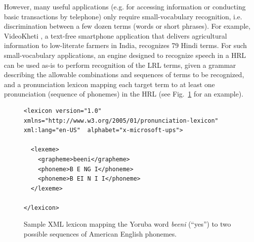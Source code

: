 \documentclass[11pt]{article}
\begin{document}
However, many useful %
applications (e.g. for accessing information or conducting basic transactions by telephone) only require small-vocabulary recognition, i.e. discrimination between
a few dozen terms (words or short phrases).
For example, VideoKheti \cite{bali13}, a text-free smartphone application that delivers agricultural information to low-literate farmers in India, 
recognizes 79 Hindi terms.
For such small-vocabulary applications, 
an engine designed to recognize speech in a HRL
can be used as-is to perform recognition of the LRL terms,
given
a grammar describing the allowable combinations and sequences of terms to be recognized, and a pronunciation lexicon mapping each target term to at least one pronunciation (sequence of phonemes) in the HRL 
(see Fig.~\ref{fig:lexicon} for an example).


\begin{figure}
\begin{lstlisting}	
<lexicon version="1.0" xmlns="http://www.w3.org/2005/01/pronunciation-lexicon" xml:lang="en-US"  alphabet="x-microsoft-ups">
		 
  <lexeme>
    <grapheme>beeni</grapheme>
    <phoneme>B E NG I</phoneme>
    <phoneme>B EI N I I</phoneme>
  </lexeme>
  
</lexicon>
\end{lstlisting}
\caption{Sample XML lexicon mapping the Yoruba word \textit{beeni} (``yes'') to two possible sequences of American English phonemes.\label{fig:lexicon}}
\end{figure}

\end{document}
